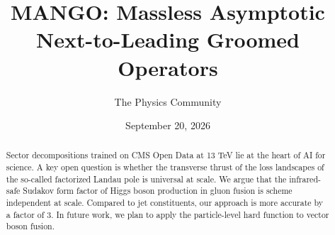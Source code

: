 \documentclass[11pt]{article}
\title{MANGO: Massless Asymptotic Next-to-Leading Groomed Operators}
\author{The Physics Community}
\date{September 20, 2026}
\numberwithin{equation}{section}
\theoremstyle{definition}
\theoremstyle{remark}
\begin{document}
\maketitle
\begin{abstract}
Sector decompositions trained on CMS Open Data at 13 TeV lie at the
heart of AI for science. A key open question is whether the transverse
thrust of the loss landscapes of the so-called factorized Landau pole is
universal at scale. We argue that the infrared-safe Sudakov form factor
of Higgs boson production in gluon fusion is scheme independent at
scale. Compared to jet constituents, our approach is more accurate by a
factor of 3. In future work, we plan to apply the particle-level hard
function to vector boson fusion.
\end{abstract}
\tableofcontents



\nocite{*}


\end{document}
